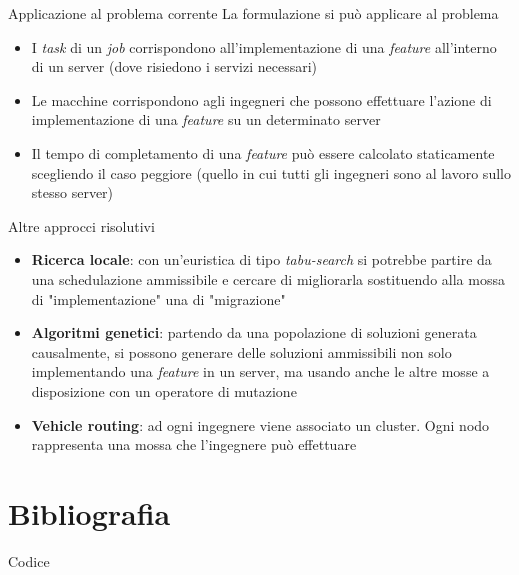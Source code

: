 \documentclass{beamer}
\begin{document}
\begin{frame}{Applicazione al problema corrente}
La formulazione si può applicare al problema
\begin{itemize}
    \item I \textit{task} di un \textit{job} corrispondono all'implementazione di una \textit{feature} all'interno di un server (dove risiedono i servizi necessari)
    \item Le macchine corrispondono agli ingegneri che possono effettuare l'azione di implementazione di una \textit{feature} su un determinato server
    \item Il tempo di completamento di una \textit{feature} può essere calcolato staticamente scegliendo il caso peggiore (quello in cui tutti gli ingegneri sono al lavoro sullo stesso server)
\end{itemize}
\end{frame}

\begin{frame}{Altre approcci risolutivi}
    \begin{itemize}
        \item \textbf{Ricerca locale}: con un'euristica di tipo \textit{tabu-search} si potrebbe partire da una schedulazione ammissibile e cercare di migliorarla sostituendo alla mossa di "implementazione" una di "migrazione"
        \item \textbf{Algoritmi genetici}: partendo da una popolazione di soluzioni generata causalmente, si possono generare delle soluzioni ammissibili non solo implementando una \textit{feature} in un server, ma usando anche le altre mosse a disposizione con un operatore di mutazione
        \item \textbf{Vehicle routing}: ad ogni ingegnere viene associato un cluster. Ogni nodo rappresenta una mossa che l'ingegnere può effettuare
    \end{itemize}
\end{frame}

\section{Bibliografia}

\begin{frame}[allowframebreaks]
    
    
\end{frame}

\begin{frame}
    \begin{center}
        {\Huge Codice}
    \end{center}
\end{frame}
\end{document}
